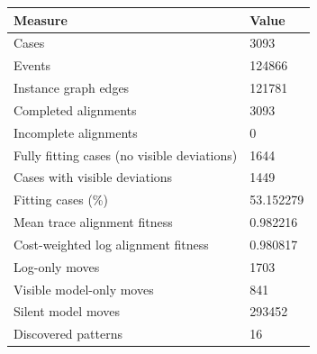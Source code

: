 \begin{tabular}{ll}
\toprule
Measure & Value \\
\midrule
Cases & 3093 \\
Events & 124866 \\
Instance graph edges & 121781 \\
Completed alignments & 3093 \\
Incomplete alignments & 0 \\
Fully fitting cases (no visible deviations) & 1644 \\
Cases with visible deviations & 1449 \\
Fitting cases (\%) & 53.152279 \\
Mean trace alignment fitness & 0.982216 \\
Cost-weighted log alignment fitness & 0.980817 \\
Log-only moves & 1703 \\
Visible model-only moves & 841 \\
Silent model moves & 293452 \\
Discovered patterns & 16 \\
\bottomrule
\end{tabular}
